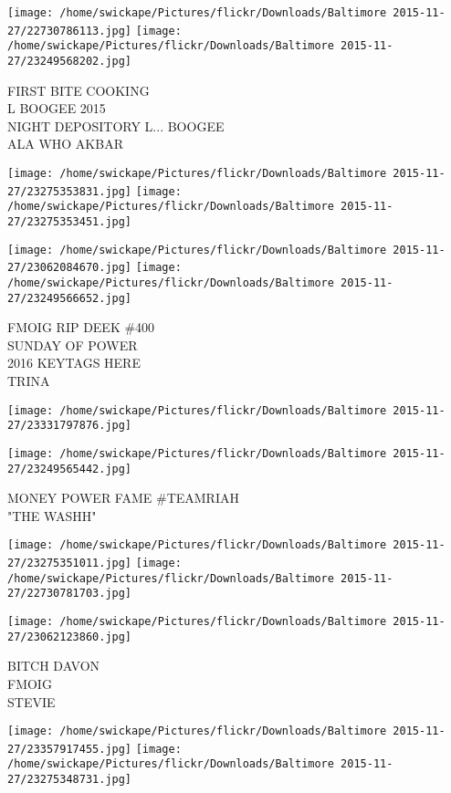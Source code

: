 \documentclass[10pt,letterpaper]{article}
\begin{document}
\texttt{[image: /home/swickape/Pictures/flickr/Downloads/Baltimore 2015-11-27/22730786113.jpg]}
\texttt{[image: /home/swickape/Pictures/flickr/Downloads/Baltimore 2015-11-27/23249568202.jpg]}

FIRST BITE COOKING\\
L BOOGEE 2015\\
NIGHT DEPOSITORY L... BOOGEE\\
ALA WHO AKBAR
\pagebreak

\texttt{[image: /home/swickape/Pictures/flickr/Downloads/Baltimore 2015-11-27/23275353831.jpg]}
\texttt{[image: /home/swickape/Pictures/flickr/Downloads/Baltimore 2015-11-27/23275353451.jpg]}

\texttt{[image: /home/swickape/Pictures/flickr/Downloads/Baltimore 2015-11-27/23062084670.jpg]}
\texttt{[image: /home/swickape/Pictures/flickr/Downloads/Baltimore 2015-11-27/23249566652.jpg]}

FMOIG RIP DEEK \#400\\
SUNDAY OF POWER\\
2016 KEYTAGS HERE\\
TRINA
\pagebreak

\texttt{[image: /home/swickape/Pictures/flickr/Downloads/Baltimore 2015-11-27/23331797876.jpg]}

\vspace{0.25in}
\texttt{[image: /home/swickape/Pictures/flickr/Downloads/Baltimore 2015-11-27/23249565442.jpg]}

MONEY POWER FAME \#TEAMRIAH\\
"THE WASHH"
\pagebreak

\texttt{[image: /home/swickape/Pictures/flickr/Downloads/Baltimore 2015-11-27/23275351011.jpg]}
\texttt{[image: /home/swickape/Pictures/flickr/Downloads/Baltimore 2015-11-27/22730781703.jpg]}

\vspace{0.25in}
\texttt{[image: /home/swickape/Pictures/flickr/Downloads/Baltimore 2015-11-27/23062123860.jpg]}

BITCH DAVON\\
FMOIG\\
STEVIE
\pagebreak

\texttt{[image: /home/swickape/Pictures/flickr/Downloads/Baltimore 2015-11-27/23357917455.jpg]}
\texttt{[image: /home/swickape/Pictures/flickr/Downloads/Baltimore 2015-11-27/23275348731.jpg]}
\end{document}
